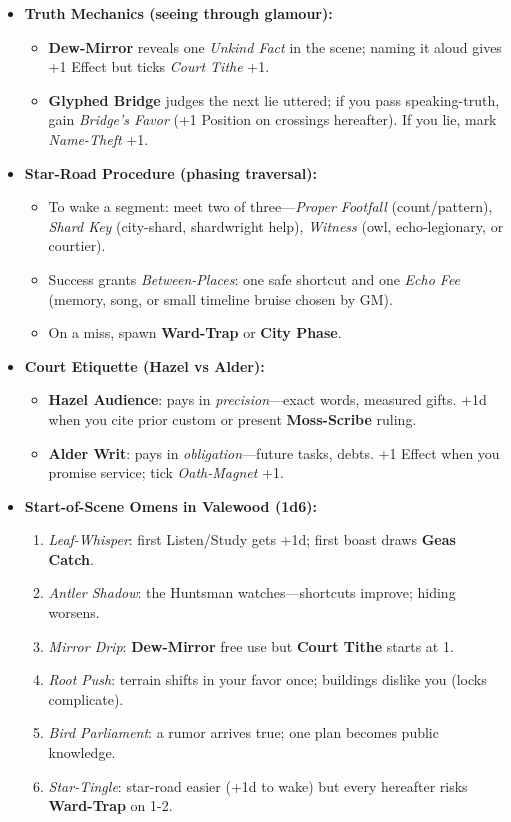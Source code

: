 \begin{itemize}
  \item \textbf{Truth Mechanics (seeing through glamour):}
  \begin{itemize}
    \item \textbf{Dew-Mirror} reveals one \emph{Unkind Fact} in the scene; naming it aloud gives +1 Effect but ticks \emph{Court Tithe} +1.
    \item \textbf{Glyphed Bridge} judges the next lie uttered; if you pass speaking-truth, gain \emph{Bridge’s Favor} (+1 Position on crossings hereafter). If you lie, mark \emph{Name-Theft} +1.
  \end{itemize}

  \item \textbf{Star-Road Procedure (phasing traversal):}
  \begin{itemize}
    \item To wake a segment: meet two of three—\emph{Proper Footfall} (count/pattern), \emph{Shard Key} (city-shard, shardwright help), \emph{Witness} (owl, echo-legionary, or courtier).
    \item Success grants \emph{Between-Places}: one safe shortcut and one \emph{Echo Fee} (memory, song, or small timeline bruise chosen by GM).
    \item On a miss, spawn \textbf{Ward-Trap} or \textbf{City Phase}.
  \end{itemize}

  \item \textbf{Court Etiquette (Hazel vs Alder):}
  \begin{itemize}
    \item \textbf{Hazel Audience}: pays in \emph{precision}—exact words, measured gifts. +1d when you cite prior custom or present \textbf{Moss-Scribe} ruling.
    \item \textbf{Alder Writ}: pays in \emph{obligation}—future tasks, debts. +1 Effect when you promise service; tick \emph{Oath-Magnet} +1.
  \end{itemize}

  \item \textbf{Start-of-Scene Omens in Valewood (1d6):}
  \begin{enumerate}
    \item \emph{Leaf-Whisper}: first Listen/Study gets +1d; first boast draws \textbf{Geas Catch}.
    \item \emph{Antler Shadow}: the Huntsman watches—shortcuts improve; hiding worsens.
    \item \emph{Mirror Drip}: \textbf{Dew-Mirror} free use but \textbf{Court Tithe} starts at 1.
    \item \emph{Root Push}: terrain shifts in your favor once; buildings dislike you (locks complicate).
    \item \emph{Bird Parliament}: a rumor arrives true; one plan becomes public knowledge.
    \item \emph{Star-Tingle}: star-road easier (+1d to wake) but every \Diamond{} hereafter risks \textbf{Ward-Trap} on 1-2.
  \end{enumerate}


\end{itemize}
